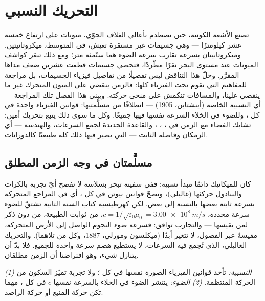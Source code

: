 \chapter{التحريك النسبي}\label{ch:b3:relativistic-kinematics}

تصنع الأشعة الكونية، حين تصطدم بأعالي الغلاف الجوّي، ميونات على
ارتفاع خمسة عشر كيلومترًا --- وهي جسيمات غير مستقرة تعيش، في
المتوسط، ميكروثانيتين. وميكروثانيتان بسرعة تقارب سرعة الضوء هما
ستّمئة متر؛ ومع ذلك تنقر كواشف الميونات عند مستوى البحر نقرًا
مطّردًا، فتحصي جسيمات قطعت عشرين ضعف مداها المقرَّر. وحلّ هذا
التناقض ليس تفصيلًا من تفاصيل فيزياء الجسيمات، بل مراجعة
للمفاهيم التي تقوم تحت الفيزياء كلها: فالزمن ينقضي على الميون
المتحرك غير ما ينقضي علينا، والمسافات تنكمش على منحى حركته.
ويبني هذا الفصل تلك المراجعة --- أي النسبية الخاصة (أينشتاين،
1905) --- انطلاقًا من مسلَّمتيها: قوانين الفيزياء واحدة في كل
، وللضوء في الخلاء السرعة نفسها فيها جميعًا. وكل ما
سوى ذلك يتبع بتحريك أمين: تشابك الفضاء مع الزمن في ،
، ، والقاعدة الجديدة لجمع السرعات،
والهندسة --- أي الزمكان وفاصله الثابت --- التي يصير فيها ذلك
كله طبيعيًا كالدورانات.

\section{مسلَّمتان في وجه الزمن المطلق}

\begin{remark}\label{rem:b3:relativistic-kinematics:conflict}
كان للميكانيك دائمًا مبدأ نسبية: ففي سفينة تبحر بسلاسة لا تفضح
أيّ تجربة بالكرات والبنادول حركتَها (غاليلي)، وتصحّ قوانين نيوتن
في كل \emph{}، أي في المراجع المتحركة بسرعة ثابتة
بعضها بالنسبة إلى بعض. لكن كهرطيسية كتاب السنة الثانية تشتقّ
للضوء سرعة محددة، $c = 1/\sqrt{\varepsilon_0\mu_0} =
\qty{3.00e8}{m/s}$، من ثوابت الطبيعة، من دون ذكر لمن
يقيسها --- والتجارب توافق: فسرعة ضوء النجوم الواصل إلى الأرض
المتحركة، مقيسةً عبر الفصول، لا تتغير أبدًا
(ميكلسون ومورلي، 1887، وكل من تلاهما). والتحريك الغاليلي، الذي
تُجمع فيه السرعات، لا يستطيع هضم سرعة واحدة للجميع. فلا بدّ أن
يتنازل شيء، وهو افتراضنا أن الزمن  مطلقان.
\end{remark}

\begin{theorem}\label{thm:b3:relativistic-kinematics:postulates}
\emph{(1) النسبية:} تأخذ قوانين الفيزياء الصورة نفسها في كل
؛ ولا تجربة تميّز السكون من الحركة المنتظمة.
\emph{(2) الضوء:} ينتشر الضوء في الخلاء بالسرعة نفسها $c$ في
كل ، مهما تكن حركة المنبع أو حركة الراصد.
\end{theorem}
\admitted

